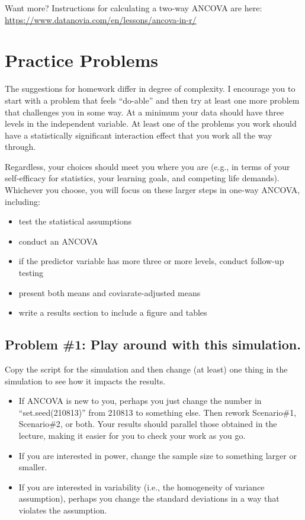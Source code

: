 \documentclass[
  11pt,
]{book}
\providecommand{\tightlist}{%
  \setlength{\itemsep}{0pt}\setlength{\parskip}{0pt}}
\begin{document}
Want more? Instructions for calculating a two-way ANCOVA are here: \url{https://www.datanovia.com/en/lessons/ancova-in-r/}

\hypertarget{practice-problems-9}{%
\section{Practice Problems}\label{practice-problems-9}}

The suggestions for homework differ in degree of complexity. I encourage you to start with a problem that feels ``do-able'' and then try at least one more problem that challenges you in some way. At a minimum your data should have three levels in the independent variable. At least one of the problems you work should have a statistically significant interaction effect that you work all the way through.

Regardless, your choices should meet you where you are (e.g., in terms of your self-efficacy for statistics, your learning goals, and competing life demands). Whichever you choose, you will focus on these larger steps in one-way ANCOVA, including:

\begin{itemize}
\tightlist
\item
  test the statistical assumptions
\item
  conduct an ANCOVA
\item
  if the predictor variable has more three or more levels, conduct follow-up testing
\item
  present both means and coviarate-adjusted means
\item
  write a results section to include a figure and tables
\end{itemize}

\hypertarget{problem-1-play-around-with-this-simulation.-3}{%
\subsection{Problem \#1: Play around with this simulation.}\label{problem-1-play-around-with-this-simulation.-3}}

Copy the script for the simulation and then change (at least) one thing in the simulation to see how it impacts the results.

\begin{itemize}
\tightlist
\item
  If ANCOVA is new to you, perhaps you just change the number in ``set.seed(210813)'' from 210813 to something else. Then rework Scenario\#1, Scenario\#2, or both. Your results should parallel those obtained in the lecture, making it easier for you to check your work as you go.
\item
  If you are interested in power, change the sample size to something larger or smaller.
\item
  If you are interested in variability (i.e., the homogeneity of variance assumption), perhaps you change the standard deviations in a way that violates the assumption.
\end{itemize}
\end{document}

